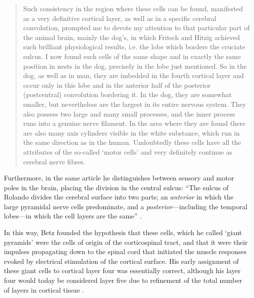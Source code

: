 \blockquote[{\protect\cite{Betz1874, Kushchayev2012}}]{Such consistency in the region where these cells can be found, manifested as a very definitive cortical layer, as well as in a specific cerebral convolution, prompted me to devote my attention to that particular part of the animal brain, mainly the dog’s, in which Fritsch and Hitzig achieved such brilliant physiological results, i.e. the lobe which borders the cruciate sulcus. I now found such cells of the same shape and in exactly the same position in nests in the dog, precisely in the lobe just mentioned. So in the dog, as well as in man, they are imbedded in the fourth cortical layer and occur only in this lobe and in the anterior half of the posterior (postcentral) convolution bordering it. In the dog, they are somewhat smaller, but nevertheless are the largest in its entire nervous system. They also possess two large and many small processes, and the inner process runs into a genuine nerve filament. In the area where they are found there are also many axis cylinders visible in the white substance, which run in the same direction as in the human. Undoubtedly these cells have all the attributes of the so-called ‘motor cells’ and very definitely continue as cerebral nerve fibres.}

Furthermore, in the same article he distinguishes between sensory and motor poles in the brain, placing the division in the central sulcus: ``The sulcus of Rolando divides the cerebral surface into two parts; an \emph{anterior} in which the large pyramidal nerve cells predominate, and a \emph{posterior}---including the temporal lobes---in which the cell layers are the same'' \cite{Betz1874,Clarke1996}.

In this way, Betz founded the hypothesis that these cells, which he called ‘giant pyramids’ were the cells of origin of the corticospinal tract, and that it were their impulses propagating down to the spinal cord that initiated the muscle responses evoked by electrical stimulation of the cortical surface. His early assignment of these giant cells to cortical layer four was essentially correct, although his layer four would today be considered layer five due to refinement of the total number of layers in cortical tissue \cite{Kushchayev2012}.


